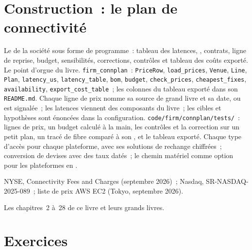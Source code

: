 \section{Construction~: le plan de connectivité}\label{bld:nw:build-a-connectivity-plan:connplan}

\begin{build}
 Le  de la société sous forme de programme~: tableau des latences, , contrats, ligne de reprise, budget,
sensibilités, corrections, contrôles et tableau des coûts exporté. Le point d'orgue du livre.
 \texttt{firm\_connplan}~: \texttt{PriceRow}, \texttt{load\_prices}, \texttt{Venue}, \texttt{Line}, \texttt{Plan},
\texttt{latency\_us}, \texttt{latency\_table}, \texttt{bom}, \texttt{budget}, \texttt{check\_prices}, \texttt{cheapest\_fixes},
\texttt{availability}, \texttt{export\_cost\_table}~; les colonnes du tableau exporté dans son \texttt{README.md}.
 Chaque ligne de prix nomme sa source de grand livre et sa date, ou est signalée~; les latences viennent des composants du livre~; les cibles et
hypothèses sont énoncées dans la configuration.
 \texttt{code/firm/connplan/tests/}~: lignes de prix, un budget calculé à la main, les contrôles et la correction sur un petit plan, un tracé de fibre
comparé à son , et le tableau exporté.
 Chaque type d'accès pour chaque plateforme, avec ses solutions de rechange chiffrées~; conversion de devises avec des taux datés~; le chemin matériel
comme option pour les plateformes en .
\end{build}

\begin{omsources}
\item NYSE, Connectivity Fees and Charges (septembre 2026)~; Nasdaq, SR-NASDAQ-2025-089~; liste de prix AWS EC2 (Tokyo, septembre 2026).
\item Les chapitres~2 à~28 de ce livre et leurs grands livres.
\end{omsources}

\section{Exercices}

